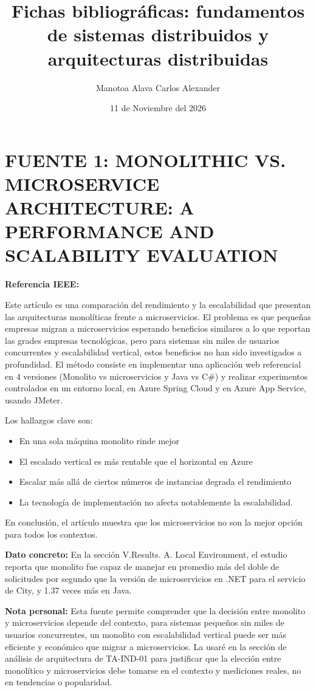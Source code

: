 \documentclass[12pt,a4paper]{article}
\title{Fichas bibliográficas: fundamentos de sistemas distribuidos y arquitecturas distribuidas}
\author{Manotoa Alava Carlos Alexander}
\date{11 de Noviembre del 2026}
\begin{document}
\maketitle

\section*{FUENTE 1: MONOLITHIC VS. MICROSERVICE ARCHITECTURE: A PERFORMANCE AND SCALABILITY EVALUATION}

\textbf{Referencia IEEE:} 

Este artículo es una comparación del rendimiento y la escalabilidad que presentan las arquitecturas monolíticas frente a microservicios. El problema es que pequeñas empresas migran a microservicios esperando beneficios similares a lo que reportan las grades empresas tecnológicas, pero para sistemas sin miles de usuarios concurrentes y escalabilidad vertical, estos beneficios no han sido investigados a profundidad. El método consiste en implementar una aplicación web referencial en 4 versiones (Monolito vs microservicios y Java vs C\#) y realizar experimentos controlados en un entorno local, en Azure Spring Cloud y en Azure App Service, usando JMeter.

Los hallazgos clave son:

\begin{itemize}
    \item En una sola máquina monolito rinde mejor
    \item El escalado vertical es más rentable que el horizontal en Azure
    \item Escalar más allá de ciertos números de instancias degrada el rendimiento
    \item La tecnología de implementación no afecta notablemente la escalabilidad.
\end{itemize}

En conclusión, el artículo muestra que los microservicios no son la mejor opción para todos los contextos.

\textbf{Dato concreto:} En la sección V.Results. A. Local Environment, el estudio reporta que monolito fue capaz de manejar en promedio más del doble de solicitudes por segundo que la versión de microservicios en .NET para el servicio de City, y 1.37 veces más en Java.

\textbf{Nota personal:} Esta fuente permite comprender que la decisión entre monolito y microservicios depende del contexto, para sistemas pequeños sin miles de usuarios concurrentes, un monolito con escalabilidad vertical puede ser más eficiente y económico que migrar a microservicios. La usaré en la sección de análisis de arquitectura de TA-IND-01 para justificar que la elección entre monolítico y microservicios debe tomarse en el contexto y mediciones reales, no en tendencias o popularidad.
\end{document}
